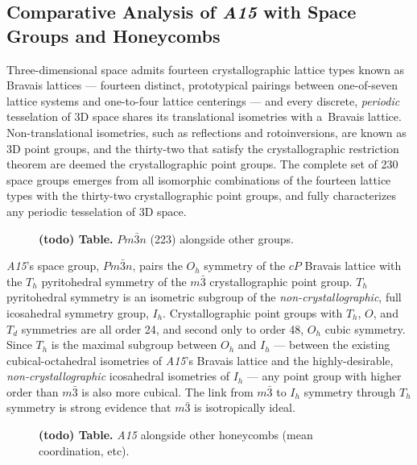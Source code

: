 \documentclass[10pt]{article}
\def\AAAB{\textit{A15}}
\begin{document}
\subsection{Comparative Analysis of \AAAB{} with Space Groups and Honeycombs}\label{comparative-analysis-of-a15-with-space-groups-and-honeycombs}

Three-dimensional space admits fourteen crystallographic lattice types known as Bravais lattices --- fourteen distinct,
prototypical pairings between one-of-seven lattice systems and one-to-four lattice centerings --- and every discrete,
\emph{periodic} tesselation of 3D space shares its translational isometries with a~Bravais lattice. Non-translational isometries,
such as reflections and rotoinversions, are known as 3D point groups, and the thirty-two that satisfy the crystallographic
restriction theorem are deemed the crystallographic point groups. The complete set of 230 space groups emerges from all
isomorphic combinations of the fourteen lattice types with the thirty-two crystallographic point groups, and fully characterizes
any periodic tesselation of 3D space.

\begin{figure}[!ht]\textbf{(todo) Table.} $Pm\bar{3}n$ (223) alongside other groups.\end{figure}

\AAAB{}'s space group, $Pm\bar{3}n$, pairs the $O_h$ symmetry of the $cP$ Bravais lattice with the $T_h$ pyritohedral symmetry of
the $m\bar{3}$ crystallographic point group. $T_h$ pyritohedral symmetry is an isometric subgroup of the
\emph{non-crystallographic}, full icosahedral symmetry group, $I_h$. Crystallographic point groups with $T_h$, $O$, and $T_d$
symmetries are all order 24, and second only to order 48, $O_h$ cubic symmetry. Since $T_h$ is the maximal subgroup between $O_h$
and $I_h$ --- between the existing cubical-octahedral isometries of \AAAB{}'s Bravais lattice and the highly-desirable,
\emph{non-crystallographic} icosahedral isometries of $I_h$ --- any point group with higher order than $m\bar{3}$ is also more
cubical. The link from $m\bar{3}$ to $I_h$ symmetry through $T_h$ symmetry is strong evidence that $m\bar{3}$ is isotropically
ideal.

\begin{figure}[!ht]\textbf{(todo) Table.} \AAAB{} alongside other honeycombs (mean coordination, etc).\end{figure}
\end{document}
